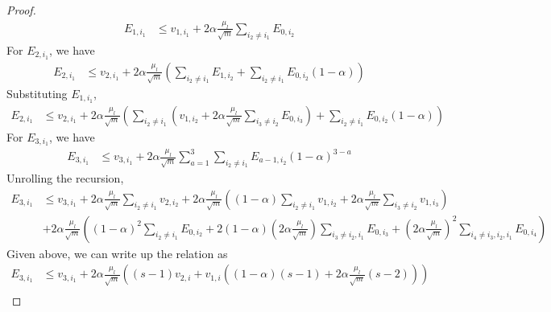 \documentclass[10pt]{article} %
\begin{document}
\begin{proof}
\begin{equation}
\begin{aligned}
E_{1, i_1} &\leq v_{1, i_1} + 2\alpha \frac{\mu_l}{\sqrt{m}} \sum_{i_2 \neq i_1} E_{0, i_2}
\end{aligned}
\end{equation}
For $E_{2, i_1}$, we have
\begin{equation}
\begin{aligned}
E_{2, i_1} &\leq v_{2, i_1} + 2 \alpha \frac{\mu_l}{\sqrt{m}} (\sum_{i_2 \neq i_1} E_{1, i_2} + \sum_{i_2 \neq i_1} E_{0, i_2} (1 - \alpha))
\end{aligned}
\end{equation}
Substituting $E_{1, i_1}$,
\begin{equation}
\begin{aligned}
E_{2, i_1} &\leq v_{2, i_1} + 2 \alpha \frac{\mu_l}{\sqrt{m}} (\sum_{i_2 \neq i_1}  (v_{1, i_2} + 2\alpha \frac{\mu_l}{\sqrt{m}} \sum_{i_3 \neq i_2} E_{0, i_3}) + \sum_{i_2 \neq i_1} E_{0, i_2} (1 - \alpha))
\end{aligned}
\end{equation}
For $E_{3, i_1}$, we have
\begin{equation}
\begin{aligned}
E_{3, i_1} &\leq v_{3, i_1} + 2 \alpha \frac{\mu_l}{\sqrt{m}} \sum_{a=1}^3 \sum_{i_2 \neq i_1} E_{a-1,i_2} (1-\alpha)^{3-a}
\end{aligned}
\end{equation}
Unrolling the recursion,
\begin{equation}
\begin{aligned}
E_{3, i_1} &\leq v_{3, i_1} + 2 \alpha \frac{\mu_l}{\sqrt{m}} \sum_{i_2 \neq i_1} v_{2,i_2} + 2 \alpha \frac{\mu_l}{\sqrt{m}} \left((1-\alpha) \sum_{i_2 \neq i_1}  v_{1,i_2} + 2 \alpha \frac{\mu_l}{\sqrt{m}} \sum_{i_3 \neq i_2} v_{1,i_3}\right)\\
&+ 2 \alpha \frac{\mu_l}{\sqrt{m}} \left( (1 - \alpha)^2 \sum_{i_2 \neq i_1} E_{0,i_2} + 2 (1-\alpha) (2\alpha \frac{\mu_l}{\sqrt{m}}) \sum_{i_3 \neq i_2, i_1}  E_{0,i_3} + (2\alpha \frac{\mu_l}{\sqrt{m}})^2 \sum_{i_4 \neq i_3, i_2, i_1} E_{0,i_4} \right)
\end{aligned}
\end{equation}
Given above, we can write up the relation as
\begin{equation}
\begin{aligned}
E_{3, i_1} &\leq v_{3, i_1} + 2 \alpha \frac{\mu_l}{\sqrt{m}} \left( (s-1) v_{2,i} + v_{1,i} ((1-\alpha) (s-1)  + 2 \alpha \frac{\mu_l}{\sqrt{m}} (s-2)) \right)\\

\end{aligned}
\end{equation}
\end{proof}
\end{document}
